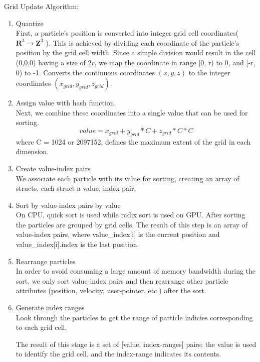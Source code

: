 \documentclass[]{article}
\begin{document}
			Grid Update Algorithm:
			\begin{enumerate}
				\item Quantize\\
				First, a particle's position is converted into integer grid cell coordinates( \( \mathbf{R}^{3} \to \mathbf{Z}^{3}\) ).
				This is achieved by dividing each coordinate of the particle's position by the grid cell width.
				Since a simple division would result in the cell (0,0,0) having a size of \(2r\), we map the coordinate 
				in range [0, r) to 0, and [-r, 0) to -1. Converts the continuous coordinates \((x, y, z)\) to the integer 
				coordinates \((x_{grid}, y_{grid}, z_{grid})\).
				
				\item Assign value with hash function\\
				Next, we combine these coordinates into a single value that can be used for sorting.
				\begin{equation}
					\label{eq_hash}
				value = x_{grid} + y_{grid} * C + z_{grid} * C * C
				\end{equation}
				where C = 1024 or 2097152, defines the maximum extent of the grid in each dimension.
				
				\item Create value-index pairs\\
				We associate each particle with its value for sorting, creating an array of structs, each struct a 
				{value, index} pair.
				
				\item Sort by value-index pairs by value\\
				On CPU, quick sort is used while radix sort is used on GPU. After sorting the particles are grouped by 
				grid cells. The result of this step is an array of value-index pairs, where value\_index[i] is the current 
				position and value\_index[i].index is the last position.
			
				\item Rearrange particles\\
				In order to avoid consuming a large amount of memory bandwidth during the sort, we only sort value-index 
				pairs and then rearrange other particle attributes (position, velocity, user-pointer, etc.) after the sort.
			
				\item Generate index ranges\\
				Look through the particles to get the range of particle indicies corresponding to each grid cell.
				
				The result of this stage is a set of [value, index-ranges] pairs; the value is used to identify
				the grid cell, and the index-range indicates its contents.
			\end{enumerate}
			
\end{document}

